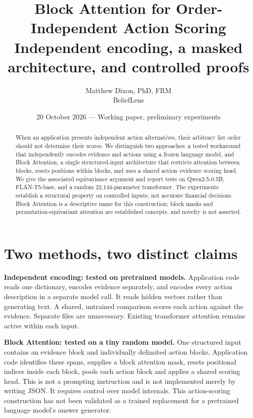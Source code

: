 \documentclass[11pt]{article}
\title{Block Attention for Order-Independent Action Scoring\\\large Independent encoding, a masked architecture, and controlled proofs}
\author{Matthew Dixon, PhD, FRM\\BeliefLens}
\date{20 October 2026 --- Working paper, preliminary experiments}
\begin{document}
\maketitle
\begin{abstract}
When an application presents independent action alternatives, their arbitrary list order should not determine their scores. We distinguish two approaches: a tested workaround that independently encodes evidence and actions using a frozen language model, and Block Attention, a single structured-input architecture that restricts attention between blocks, resets positions within blocks, and uses a shared action--evidence scoring head. We give the associated equivariance argument and report tests on Qwen2.5-0.5B, FLAN-T5-base, and a random 22,144-parameter transformer. The experiments establish a structural property on controlled inputs, not accurate financial decisions. Block Attention is a descriptive name for this construction; block masks and permutation-equivariant attention are established concepts, and novelty is not asserted.
\end{abstract}
\section{Two methods, two distinct claims}
\textbf{Independent encoding: tested on pretrained models.} Application code reads one dictionary, encodes evidence separately, and encodes every action description in a separate model call. It reads hidden vectors rather than generating text. A shared, untrained comparison scores each action against the evidence. Separate files are unnecessary. Existing transformer attention remains active within each input.

\textbf{Block Attention: tested on a tiny random model.} One structured input contains an evidence block and individually delimited action blocks. Application code identifies these spans, supplies a block attention mask, resets positional indices inside each block, pools each action block and applies a shared scoring head. This is not a prompting instruction and is not implemented merely by writing JSON. It requires control over model internals. This action-scoring construction has not been validated as a trained replacement for a pretrained language model's answer generator.
\end{document}
